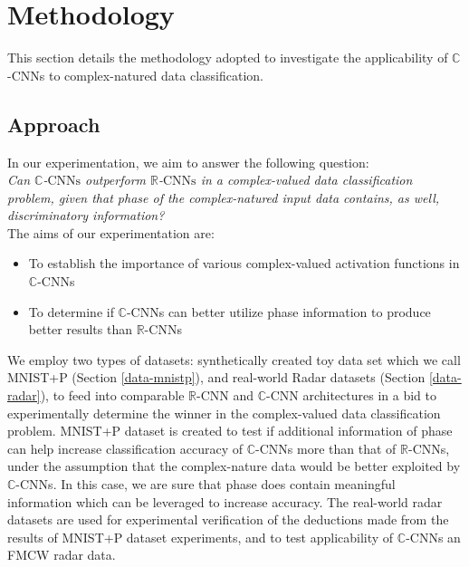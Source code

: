 \chapter{Methodology} \label{chap:methodology}
 
This section details the methodology adopted to investigate the applicability of $\mathbb{C}$-CNNs to complex-natured data classification. 

\section{Approach}

In our experimentation, we aim to answer the following question:\\
 
 \textit{Can $\mathbb{C}$-$\mathrm{CNNs}$ outperform $\mathbb{R}$-$\mathrm{CNNs}$ in a complex-valued data classification problem, given that phase of the complex-natured input data contains, as well, discriminatory information?}\\
 
 The aims of our experimentation are:
 \begin{itemize}
 	\item To establish the importance of various complex-valued activation functions in $\mathbb{C}$-CNNs
 	\item To determine if $\mathbb{C}$-CNNs can better utilize phase information to produce better results than $\mathbb{R}$-CNNs
 \end{itemize}
 
 
 We employ two types of datasets: synthetically created toy data set which we call MNIST+P (Section \ref{data-mnistp}), and real-world Radar datasets (Section \ref{data-radar}), to feed into comparable $\mathbb{R}$-CNN and $\mathbb{C}$-CNN architectures in a bid to experimentally determine the winner in the complex-valued data classification problem. MNIST+P dataset is created to test if additional information of phase can help increase classification accuracy of $\mathbb{C}$-CNNs more than that of $\mathbb{R}$-CNNs, under the assumption that the complex-nature data would be better exploited by $\mathbb{C}$-CNNs. In this case, we are sure that phase does contain meaningful information which can be leveraged to increase accuracy. The real-world radar datasets are used for experimental verification of the deductions made from the results of MNIST+P dataset experiments, and to test applicability of $\mathbb{C}$-CNNs an FMCW radar data. 
 
